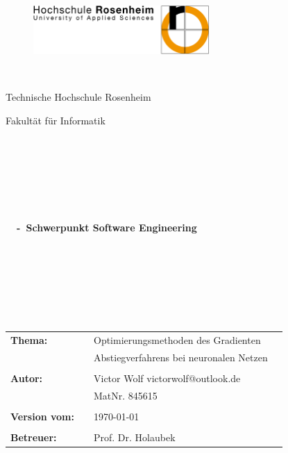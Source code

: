 \thispagestyle{empty}


\begin{figure}
 \begin{flushright}
 \includegraphics[width=0.6\textwidth]{abb/FHRO_Logo.PNG}
 \end{flushright}
\end{figure}


\begin{verbatim}


\end{verbatim}

\begin{center}
\Large{Technische Hochschule Rosenheim}
\end{center}


\begin{center}
\Large{Fakultät für Informatik}
\end{center}
\begin{verbatim}




\end{verbatim}
\begin{center}
\doublespacing
\textbf{\LARGE{\titleDocument}}\\
\singlespacing
\begin{verbatim}

\end{verbatim}
\textbf{{~\subjectDocument~-~Schwerpunkt Software Engineering}}
\end{center}
\begin{verbatim}

\end{verbatim}
\begin{center}

\end{center}

\begin{verbatim}






\end{verbatim}
\begin{flushleft}
\begin{tabular}{llll}
\textbf{Thema:} & & Optimierungsmethoden des Gradienten\\ & & Abstiegverfahrens bei neuronalen Netzen & \\
& & \\
\textbf{Autor:} & & Victor Wolf victorwolf@outlook.de& \\
& & MatNr. 845615 & \\
& & \\
\textbf{Version vom:} & & \today &\\
& & \\
\textbf{Betreuer:} & & Prof. Dr. Holaubek &\\
\end{tabular}
\end{flushleft}
